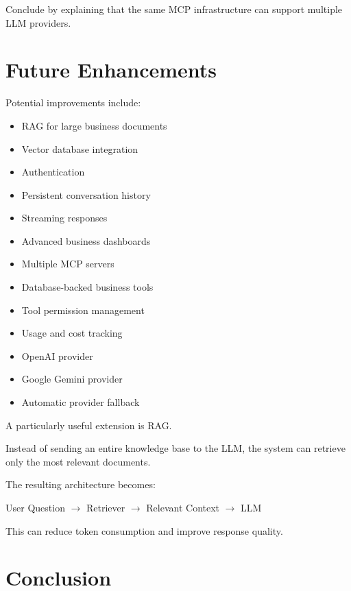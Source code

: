 \documentclass[11pt,a4paper]{article}
\begin{document}
Conclude by explaining that the same MCP infrastructure can support
multiple LLM providers.

\section{Future Enhancements}

Potential improvements include:

\begin{itemize}
\item RAG for large business documents
\item Vector database integration
\item Authentication
\item Persistent conversation history
\item Streaming responses
\item Advanced business dashboards
\item Multiple MCP servers
\item Database-backed business tools
\item Tool permission management
\item Usage and cost tracking
\item OpenAI provider
\item Google Gemini provider
\item Automatic provider fallback
\end{itemize}

A particularly useful extension is RAG.

Instead of sending an entire knowledge base to the LLM, the system can
retrieve only the most relevant documents.

The resulting architecture becomes:

\begin{center}

User Question
$\rightarrow$
Retriever
$\rightarrow$
Relevant Context
$\rightarrow$
LLM

\end{center}

This can reduce token consumption and improve response quality.

\section{Conclusion}
\end{document}
